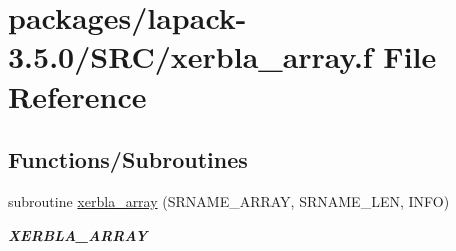 \hypertarget{SRC_2xerbla__array_8f}{}\section{packages/lapack-\/3.5.0/\+S\+R\+C/xerbla\+\_\+array.f File Reference}
\label{SRC_2xerbla__array_8f}
\subsection*{Functions/\+Subroutines}
\begin{DoxyCompactItemize}
\item 
subroutine \hyperlink{group__auxOTHERauxiliary_ga45f1b23f68dd586f20299b80d1c9288d}{xerbla\+\_\+array} (S\+R\+N\+A\+M\+E\+\_\+\+A\+R\+R\+A\+Y, S\+R\+N\+A\+M\+E\+\_\+\+L\+E\+N, I\+N\+F\+O)
\begin{DoxyCompactList}\small\item\em {\bfseries X\+E\+R\+B\+L\+A\+\_\+\+A\+R\+R\+A\+Y} \end{DoxyCompactList}\end{DoxyCompactItemize}
